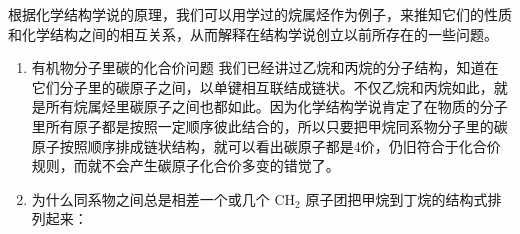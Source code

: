 根据化学结构学说的原理，我们可以用学过的烷属烃作为例子，来推知它们的性质和化学结构之间的相互关系，从而解释在结构学说创立以前所存在的一些问题。

\begin{enumerate}
\item
  有机物分子里碳的化合价问题
  我们已经讲过乙烷和丙烷的分子结构，知道在它们分子里的碳原子之间，以单键相互联结成链状。不仅乙烷和丙烷如此，就是所有烷属烃里碳原子之间也都如此。因为化学结构学说肯定了在物质的分子里所有原子都是按照一定顺序彼此结合的，所以只要把甲烷同系物分子里的碳原子按照顺序排成链状结构，就可以看出碳原子都是4价，仍旧符合于化合价规则，而就不会产生碳原子化合价多变的错觉了。
\item
  为什么同系物之间总是相差一个或几个 \(\mathrm{CH}_2\)
  原子团把甲烷到丁烷的结构式排列起来：
\end{enumerate}

